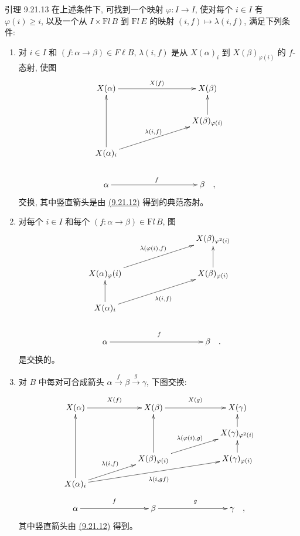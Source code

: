 \begin{enonce*}{引理 9.21.13}
在上述条件下, 可找到一个映射 $\varphi:I\rightarrow I$, 使对每个 $i\in I$ 有 $\varphi(i)\geq i$, 以及一个从 $I\times %
\mathrm{F}{}l\,B$ 到 $%
\mathrm{F}{}l\,E$ 的映射 $(i,f)\mapsto\lambda(i,f)$, 满足下列条件:
\begin{enumerate}
\renewcommand{\theenumi}{\alph{enumi}}
\renewcommand{\labelenumi}{\theenumi)}
\item 对 $i\in I$ 和 $(f:\alpha\rightarrow\beta)\in F\ell B$, $\lambda(i,f)$ 是从 $X(\alpha)_i$ 到 $X(\beta)_{\varphi(i)}$ 的 $f$-态射, 使图
\[
\xymatrix@C=3cm@R=.8cm{
 X(\alpha)\ar[r]^{X(f)} & X(\beta)\\
           &  X(\beta)_{\varphi(i)}\ar[u]\\
X(\alpha)_{i} \ar[uu]\ar[ru]^{\lambda(i,f)}&
                  \\
\alpha \ar[r]^{f}& \beta\quad , }
\]
交换, 其中竖直箭头是由 \hyperlink{sga4.exp.I.equation.9.21.12}{(9.21.12)} 得到的典范态射。

\item 对\pageoriginale 每个 $i\in I$ 和每个 $(f:\alpha\rightarrow\beta)\in %
\mathrm{F}{}l\,B$, 图
\[
\xymatrix@C=3cm@R=.9cm@L=6pt{
                      & X(\beta)_{\varphi^{2}(i)}\\
  X(\alpha)_\varphi(i) \ar[ru]^{\lambda(\varphi(i),f)}  & X(\beta)_{\varphi(i)} \ar[u]\\
X(\alpha)_i  \ar[ru]_{\lambda(i,f)} \ar[u]         \\
\alpha \ar[r]^{f} & \beta\quad . }
\]
是交换的。

\item 对 $B$ 中每对可合成箭头 $\alpha\xrightarrow{f}\beta\xrightarrow{g}\gamma$, 下图交换:
\[
\xymatrix@C=2cm@L=6pt@R=.5cm{
X(\alpha) \ar[r]^{X(f)}& X(\beta) \ar[r]^{X(g)}            & X(\gamma)\\
          &                      & X(\gamma)_{\varphi^{2}(i)}\ar[u]\\
          & X(\beta)_{\varphi(i)} \ar[uu]\ar[ru]^{\lambda(\varphi(i),g)} & X(\gamma)_{\varphi(i)}\ar[u]\\
X(\alpha)_i \ar[uuu]\ar[ru]^{\lambda(i,f)} \ar[rru]_{\lambda(i,gf)}&
 \\
\alpha \ar[r]^{f}& \beta \ar[r]^{g}& \gamma\quad , }
\]
其中竖直箭头由 \hyperlink{sga4.exp.I.equation.9.21.12}{(9.21.12)} 得到。
\end{enumerate}
\end{enonce*}

